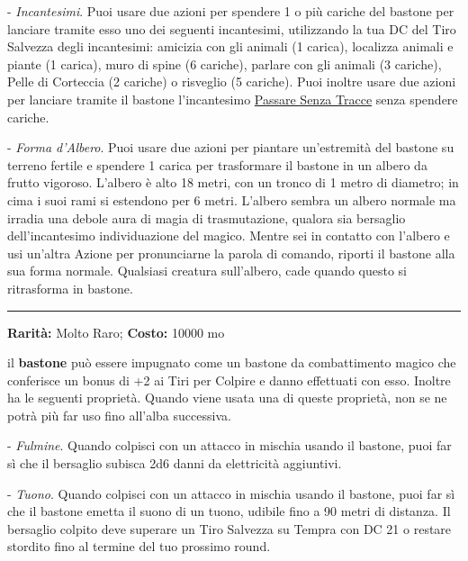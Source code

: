 \begin{multicols}{2}
- \emph{Incantesimi}. Puoi usare due azioni per spendere 1 o più cariche del bastone per lanciare tramite esso uno dei seguenti incantesimi, utilizzando la tua DC del Tiro Salvezza degli incantesimi: amicizia con gli animali (1 carica), localizza animali e piante (1 carica), muro di spine (6 cariche), parlare con gli animali (3 cariche), Pelle di Corteccia (2 cariche) o risveglio (5 cariche). Puoi inoltre usare due azioni per lanciare tramite il bastone l'incantesimo \hyperlink{Passare Senza Tracce}{Passare Senza Tracce} senza spendere cariche.

- \emph{Forma d'Albero}. Puoi usare due azioni per piantare un'estremità del bastone su terreno fertile e spendere 1 carica per trasformare il bastone in un albero da frutto vigoroso. L'albero è alto 18 metri, con un tronco di 1 metro di diametro; in cima i suoi rami si estendono per 6 metri. L'albero sembra un albero normale ma irradia una debole aura di magia di trasmutazione, qualora sia bersaglio dell'incantesimo individuazione del magico. Mentre sei in contatto con l'albero e usi un'altra Azione per pronunciarne la parola di comando, riporti il bastone alla sua forma normale. Qualsiasi creatura sull'albero, cade quando questo si ritrasforma in bastone.

\smallskip\noindent\rule{\linewidth}{2pt}  \hypertarget{BastonedeiTuonieFulmini}{}\medskip{}\noindent\label{BastonedeiTuonieFulmini}

\textbf{Rarità:} Molto Raro; \textbf{Costo:} 10000 mo

il \textbf{bastone} può essere impugnato come un bastone da combattimento magico che conferisce un bonus di +2 ai Tiri per Colpire e danno effettuati con esso. Inoltre ha le seguenti proprietà. Quando viene usata una di queste proprietà, non se ne potrà più far uso fino all'alba successiva.

- \emph{Fulmine}. Quando colpisci con un attacco in mischia usando il bastone, puoi far sì che il bersaglio subisca 2d6 danni da elettricità aggiuntivi.

- \emph{Tuono}. Quando colpisci con un attacco in mischia usando il bastone, puoi far sì che il bastone emetta il suono di un tuono, udibile fino a 90 metri di distanza. Il bersaglio colpito deve superare un Tiro Salvezza su Tempra con DC 21 o restare stordito fino al termine del tuo prossimo round.


\end{multicols}
